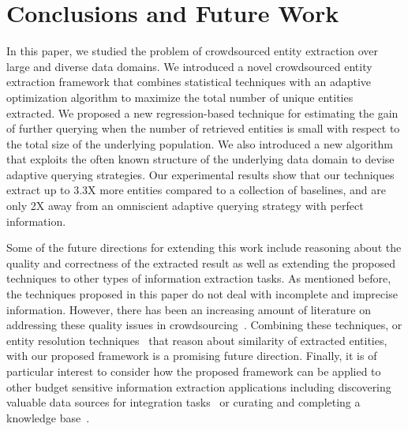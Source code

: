 
\section{Conclusions and Future Work}
\label{sec:conclusions}
In this paper, we studied the problem of crowdsourced entity extraction over large and diverse data domains. We introduced a novel crowdsourced entity extraction framework that combines statistical techniques with an adaptive optimization algorithm to maximize the total number of unique entities extracted. We proposed a new regression-based technique for estimating the gain of further querying when the number of retrieved entities is small with respect to the total size of the underlying population. We also introduced a new algorithm that exploits the often known structure of the underlying data domain to devise adaptive querying strategies. Our experimental results show that our techniques extract up to 3.3X more entities compared to a collection of baselines, and are only 2X  away from an omniscient adaptive querying strategy with perfect information.

Some of the future directions for extending this work include reasoning about the quality and correctness of the extracted result as well as extending the proposed techniques to other types of information extraction tasks. As mentioned before, the techniques proposed in this paper do not deal with incomplete and imprecise information. However, there has been an increasing amount of literature on addressing these quality issues in crowdsourcing~\cite{ vox-populii, quality, nushi:14, raykar-whom-to-trust}. Combining these techniques, or entity resolution techniques~\cite{crowder} that reason about similarity of extracted entities, with our proposed framework is a promising future direction. Finally, it is of particular interest to consider how the proposed framework can be applied to other budget sensitive information extraction applications including discovering valuable data sources for integration tasks~\cite{rekatsinas:2015} or curating and completing a knowledge base~\cite{kondredi:2014}.